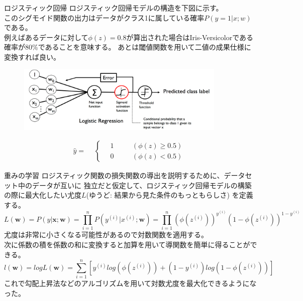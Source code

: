 \documentclass[aspectratio=169, dvipdfmx, 11pt]{beamer} %
\begin{document}
\begin{frame}{ロジスティック回帰}
    ロジスティック回帰モデルの構造を下図に示す。 \\
    このシグモイド関数の出力はデータがクラス1に属している確率\(P(y=1|x;w)\)である。 \\
    例えばあるデータに対して\(\phi(z)=0.8\)が算出された場合はIris-Versicolorである確率が80\%であることを意味する。
    あとは閾値関数を用いて二値の成果仕様に変換すれば良い。
    \begin{figure}[b]
        \begin{center}
        \includegraphics[width=100mm]{img/day02/fig03.png}
        \end{center}
    \end{figure}
    \begin{equation*}
        \hat{y} = 
        \begin{aligned}
            & \left\{ \,
                \begin{aligned}
                    & 1 & \quad &(\phi(z) \geq 0.5) \\
                    & 0 & \quad &(\phi(z) < 0.5)
                \end{aligned}
            \right.
        \end{aligned}
    \end{equation*}
\end{frame}

\begin{frame}{重みの学習}
    ロジスティック関数の損失関数の導出を説明するために、データセット中のデータが互いに
    独立だと仮定して、ロジスティック回帰モデルの構築の際に最大化したい尤度\(L\)(ゆうど: 結果から見た条件のもっともらしさ)
    を定義する。
    \begin{equation*}
        L(\textbf{w}) = P(y|\textbf{x};\textbf{w})
        = \prod_{i=1}^n P(y^{(i)}|x^{(i)};\textbf{w})
        = \prod_{i=1}^n (\phi (z^{(i)}))^{y^{(i)}} (1-\phi (z^{(i)}))^{1-y^{(i)}}
    \end{equation*}
    尤度は非常に小さくなる可能性があるので対数関数を適用する。\\
    次に係数の積を係数の和に変換すると加算を用いて導関数を簡単に得ることができる。
    \begin{equation*}
        l(\textbf{w}) = logL(\textbf{w})
        = \sum_{i=1}^{n} [y^{(i)} log(\phi (z^{(i)})) + (1-y^{(i)})log(1-\phi (z^{(i)}))]
    \end{equation*}
    これで勾配上昇法などのアルゴリズムを用いて対数尤度を最大化できるようになった。
\end{frame}
\end{document}
